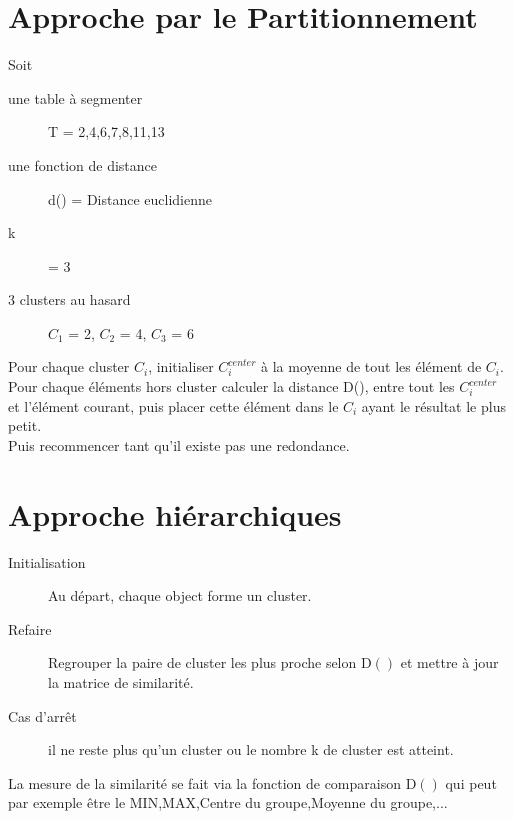\section{Approche par le Partitionnement}

Soit
\begin{description}
\item[une table à segmenter] T = {2,4,6,7,8,11,13}
\item[une fonction de distance] d() = Distance euclidienne
\item[k] = 3
\item[3 clusters au hasard] $C_1$ = {2}, $C_2$ = {4}, $C_3$ = {6}
\end{description} 

Pour chaque cluster $C_i$, initialiser $C_i^{center}$ à la moyenne de tout les élément de $C_i$.\\
Pour chaque éléments hors cluster calculer la distance D(), entre tout les $C_i^{center}$ et l'élément courant,
puis placer cette élément dans le $C_i$ ayant le résultat le plus petit.\\
Puis recommencer tant qu'il existe pas une redondance.\\

\pagebreak
\section{Approche hiérarchiques}

\begin{description}
\item[Initialisation] Au départ, chaque object forme un cluster.
\item[Refaire] Regrouper la paire de cluster les plus proche selon D$()$ et mettre à jour la matrice de similarité.
\item[Cas d'arrêt] il ne reste plus qu'un cluster ou le nombre k de cluster est atteint.
\end{description}

La mesure de la similarité se fait via la fonction de comparaison D$()$ qui peut par exemple être le MIN,MAX,Centre du groupe,Moyenne du groupe,$...$\\

